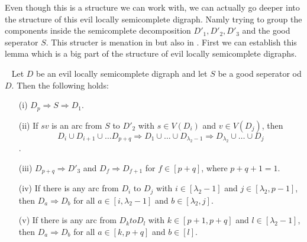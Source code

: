 Even though this is a structure we can work with, we can actually go deeper into the structure of this evil locally semicomplete digraph. Namly trying to group the components inside the semicomplete decomposition $D'_1,D'_2,D'_3$ and the good seperator $S$. This structer is menation in \cite{bangJGT85} but also in \cite{tildeDMCS}. First we can establish this lemma which is a big part of the structure of evil locally semicomplete digraphs.
\begin{lemma}~\cite{tildeDMCS}
    Let $D$ be an evil locally semicomplete digraph and let $S$ be a good seperator od $D$. Then the following holds:
    \begin{itemize}
        \item[(i)] $D_p\Rightarrow S\Rightarrow D_1$.
        \item[(ii)] If $sv$ is an arc from $S$ to $D'_2$ with $s\in V(D_i)$ and $v\in V(D_j)$, then 
        \begin{equation*}
            D_i\cup D_{i+1}\cup \dots D_{p+q}\Rightarrow D_1\cup\dots \cup D_{\lambda_2-1}\Rightarrow D_\lambda_2\cup \dots \cup D_j
        \end{equation*}.
        \item[(iii)] $D_{p+q}\Rightarrow D'_3$ and $D_f\Rightarrow D_{f+1}$ for $f\in [p+q]$, where $p+q+1=1$.
        \item[(iv)] If there is any arc from $D_i$ to $D_j$ with $i\in [\lambda_2-1]$ and $j\in [\lambda_2,p-1]$, then $D_a\Rightarrow D_b$ for all $a\in [i,\lambda_2-1]$ and $b\in[\lambda_2,j]$.
        \item[(v)] If there is any arc from $D_k to D_l$ with $k\in [p+1,p+q]$ and $l\in [\lambda_2-1]$, then $D_a\Rightarrow D_b$ for all $a\in [k,p+q]$ and $b\in [l]$.   
    \end{itemize}
\end{lemma}
